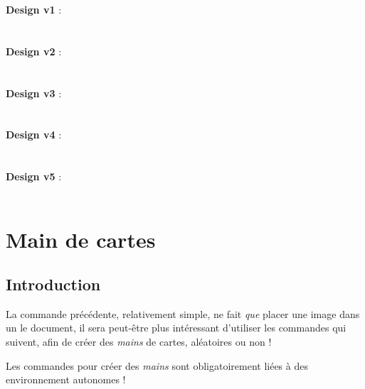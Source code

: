 \documentclass{article}
\newcommand\ctex[1]{\tcbox[vignettelatex]{#1}}
\begin{document}
{{{{{{{{{\begin{codetex}[]
\textbf{Design v1} :\\
 \\ \\
\textbf{Design v2} :\\
 \\ \\
\textbf{Design v3} :\\
 \\ \\
\textbf{Design v4} :\\
 \\ \\
\textbf{Design v5} :\\
 \\
\end{codetex}

\pagebreak

\section{Main de cartes}

\subsection{Introduction}

\begin{codeidee}
La commande précédente, relativement simple, ne fait \textit{que} placer une image dans un le document, il sera peut-être plus intéressant d'utiliser les commandes qui suivent, afin de créer des \textit{mains} de cartes, aléatoires ou non !
\end{codeidee}

\begin{codeattention}
Les commandes pour créer des \textit{mains} sont obligatoirement liées à des environnement \ctex{tikzpicture} autonomes !
\end{codeattention}

\begin{codetex}
\end{codetex}

}}}}}}}}}
\end{document}
